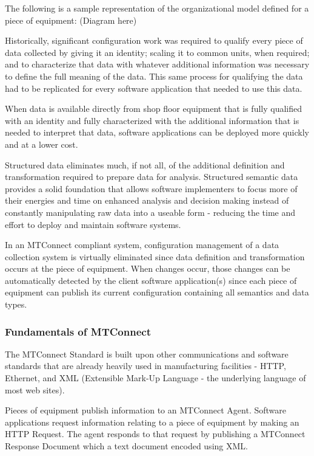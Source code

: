 The following is a sample representation of the organizational model defined for a piece of equipment: (Diagram here)

Historically, significant configuration work was required to qualify every piece of data collected by giving it an identity; scaling it to common units, when required; and to characterize that data with whatever additional information was necessary to define the full meaning of the data.   This same process for qualifying the data had to be replicated for every software application that needed to use this data.    

When data is available directly from shop floor equipment that is fully qualified with an identity and fully characterized with the additional information that is needed to interpret that data, software applications can be deployed more quickly and at a lower cost.    

Structured data eliminates much, if not all, of the additional definition and transformation required to prepare data for analysis.   Structured semantic data provides a solid foundation that allows software implementers to focus more of their energies and time on enhanced analysis and decision making instead of constantly manipulating raw data into a useable form - reducing the time and effort to deploy and maintain software systems.  
 
In an MTConnect compliant system, configuration management of a data collection system is virtually eliminated since data definition and transformation occurs at the piece of equipment.   When changes occur, those changes can be automatically detected by the client software application(s) since each piece of equipment can publish its current configuration containing all semantics and data types.

\subsubsection{Fundamentals of MTConnect}

The MTConnect Standard is built upon other communications and software standards that are already heavily used in manufacturing facilities - HTTP, Ethernet, and XML (Extensible Mark-Up Language - the underlying language of most web sites).
 
Pieces of equipment publish information to an MTConnect Agent.  Software applications request information relating to a piece of equipment by making an HTTP Request. The agent responds to that request by publishing a MTConnect Response Document which a text document encoded using XML.   
 
